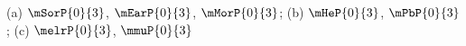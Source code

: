 (a) $\mSorP{0}{3}$, $\mEarP{0}{3}$, $\mMorP{0}{3}$; (b) $\mHeP{0}{3}$, $\mPbP{0}{3}$; (c) $\melrP{0}{3}$, $\mmuP{0}{3}$
